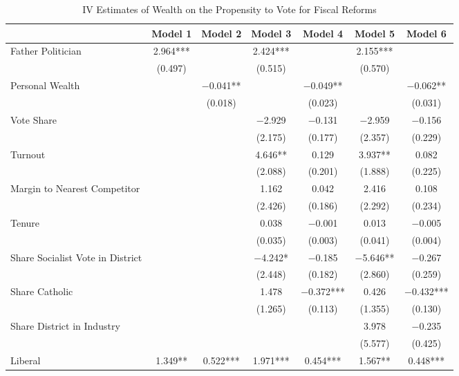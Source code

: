 \begin{table}

\caption{\label{tab:ivresults}IV Estimates of Wealth on the Propensity to Vote for Fiscal Reforms}
\centering
\begin{tabular}[t]{lcccccc}
\toprule
  & Model 1 & Model 2 & Model 3 & Model 4 & Model 5 & Model 6\\
\midrule
Father Politician & \num{2.964}*** &  & \num{2.424}*** &  & \num{2.155}*** & \\
 & (\num{0.497}) &  & (\num{0.515}) &  & (\num{0.570}) & \\
Personal Wealth &  & \num{-0.041}** &  & \num{-0.049}** &  & \num{-0.062}**\\
 &  & (\num{0.018}) &  & (\num{0.023}) &  & (\num{0.031})\\
Vote Share &  &  & \num{-2.929} & \num{-0.131} & \num{-2.959} & \num{-0.156}\\
 &  &  & (\num{2.175}) & (\num{0.177}) & (\num{2.357}) & (\num{0.229})\\
Turnout &  &  & \num{4.646}** & \num{0.129} & \num{3.937}** & \num{0.082}\\
 &  &  & (\num{2.088}) & (\num{0.201}) & (\num{1.888}) & (\num{0.225})\\
Margin to Nearest Competitor &  &  & \num{1.162} & \num{0.042} & \num{2.416} & \num{0.108}\\
 &  &  & (\num{2.426}) & (\num{0.186}) & (\num{2.292}) & (\num{0.234})\\
Tenure &  &  & \num{0.038} & \num{-0.001} & \num{0.013} & \num{-0.005}\\
 &  &  & (\num{0.035}) & (\num{0.003}) & (\num{0.041}) & (\num{0.004})\\
Share Socialist Vote in District &  &  & \num{-4.242}* & \num{-0.185} & \num{-5.646}** & \num{-0.267}\\
 &  &  & (\num{2.448}) & (\num{0.182}) & (\num{2.860}) & (\num{0.259})\\
Share Catholic &  &  & \num{1.478} & \num{-0.372}*** & \num{0.426} & \num{-0.432}***\\
 &  &  & (\num{1.265}) & (\num{0.113}) & (\num{1.355}) & (\num{0.130})\\
Share District in Industry &  &  &  &  & \num{3.978} & \num{-0.235}\\
 &  &  &  &  & (\num{5.577}) & (\num{0.425})\\
Liberal & \num{1.349}** & \num{0.522}*** & \num{1.971}*** & \num{0.454}*** & \num{1.567}** & \num{0.448}***\\

\end{tabular}
\end{table}
